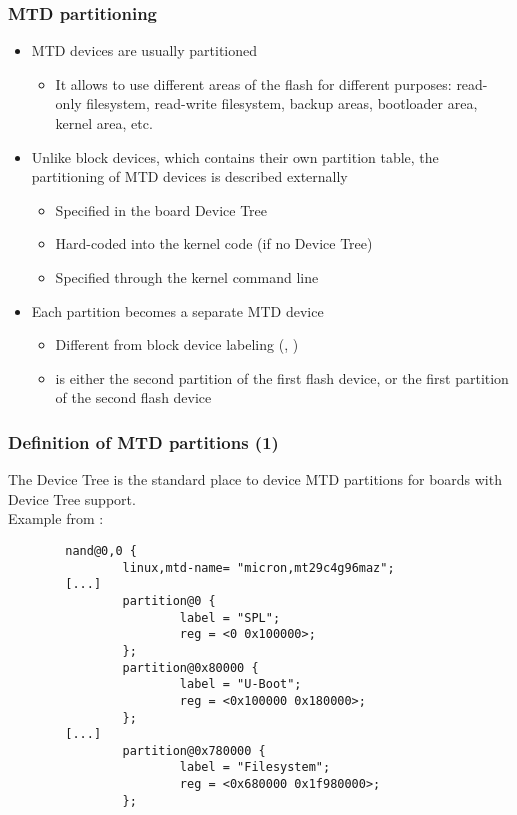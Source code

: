 \begin{frame}
  \frametitle{MTD partitioning}
  \begin{itemize}
  \item MTD devices are usually partitioned
    \begin{itemize}
    \item It allows to use different areas of the flash for different
      purposes: read-only filesystem, read-write filesystem, backup
      areas, bootloader area, kernel area, etc.
    \end{itemize}
  \item Unlike block devices, which contains their own partition
    table, the partitioning of MTD devices is described externally
    \begin{itemize}
    \item Specified in the board Device Tree
    \item Hard-coded into the kernel code (if no Device Tree)
    \item Specified through the kernel command line
    \end{itemize}
  \item Each partition becomes a separate MTD device
    \begin{itemize}
    \item Different from block device labeling (,
      )
    \item {} is either the second partition of the first
      flash device, or the first partition of the second flash device
\end{itemize}
\end{itemize}
\end{frame}

\begin{frame}[fragile]
  \frametitle{Definition of MTD partitions (1)}
  The Device Tree is the standard place to device MTD partitions
  for boards with Device Tree support.\\
  Example from :
\begin{verbatim}
        nand@0,0 {
                linux,mtd-name= "micron,mt29c4g96maz";
		[...]
                partition@0 {
                        label = "SPL";
                        reg = <0 0x100000>;
                };
                partition@0x80000 {
                        label = "U-Boot";
                        reg = <0x100000 0x180000>;
                };
		[...]
                partition@0x780000 {
                        label = "Filesystem";
                        reg = <0x680000 0x1f980000>;
                };
\end{verbatim}
\end{frame}

